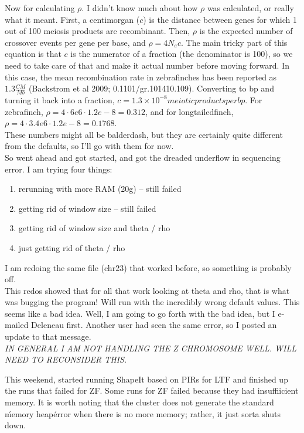 \documentclass[idxtotoc,hyperref,openany,oneside]{labbook} %
\begin{document}
Now for calculating $\rho$. I didn't know much about how $\rho$ was calculated, or really what it meant. First, a centimorgan ($c$) is the distance between genes for which 1 out of 100 meiosis products are recombinant. Then, $\rho$ is the expected number of crossover events per gene per base, and $\rho = 4N_ec$. The main tricky part of this equation is that $c$ is the numerator of a fraction (the denominator is 100), so we need to take care of that and make it actual number before moving forward. In this case, the mean recombination rate in zebrafinches has been reported as $1.3 \frac{CM}{Mb}$ (Backstrom et al 2009; 0.1101/gr.101410.109). Converting to bp and turning it back into a fraction, $c = 1.3 \times 10^{-8} meiotic products per bp$. For zebrafinch, $\rho = 4 \cdot 6e6 \cdot 1.2e-8 = 0.312$, and for longtailedfinch, $\rho = 4 \cdot 3.4e6 \cdot 1.2e-8 = 0.1768$. \\

These numbers might all be balderdash, but they are certainly quite different from the defaults, so I'll go with them for now. \\

So went ahead and got started, and got the dreaded underflow in sequencing error. I am trying four things:
\begin{enumerate}
\item rerunning with more RAM (20g) -- still failed
\item getting rid of window size -- still failed
\item getting rid of window size and theta / rho
\item just getting rid of theta / rho
\end{enumerate}
I am redoing the same file (chr23) that worked before, so something is probably off. \\

This redos showed that for all that work looking at theta and rho, that is what was bugging the program! Will run with the incredibly wrong default values. This seems like a bad idea. Well, I am going to go forth with the bad idea, but I e-mailed Deleneau first. Another user had seen the same error, so I posted an update to that message. \\

\emph{IN GENERAL I AM NOT HANDLING THE Z CHROMOSOME WELL. WILL NEED TO RECONSIDER THIS.}


This weekend, started running ShapeIt based on PIRs for LTF and finished up the runs that failed for ZF. Some runs for ZF failed because they had insuffiicient memory. It is worth noting that the cluster does not generate the standard \'memory heap\' error when there is no more memory; rather, it just sorta shuts down. \\
\end{document}
